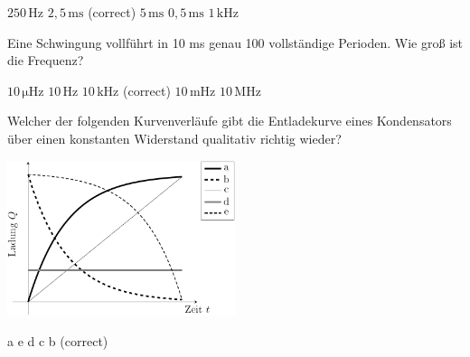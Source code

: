 \documentclass[11pt]{exam}
\begin{document}
\begin{questions}
\begin{choices}
	\choice \(\mathrm{250\,Hz}\)
	\choice \(\mathrm{2,5\,ms}\) (correct)
	\choice \(\mathrm{5\,ms}\)
	\choice \(\mathrm{0,5\,ms}\)
	\choice \(\mathrm{1\,kHz}\)
\end{choices}

\vspace{3mm}\question Eine Schwingung vollführt in 10 ms genau 100 vollständige Perioden. Wie groß ist die Frequenz?

\begin{choices}
	\choice \(\mathrm{10\,\mu Hz}\)
	\choice \(\mathrm{10\,Hz}\)
	\choice \(\mathrm{10\,kHz}\) (correct)
	\choice \(\mathrm{10\,mHz}\)
	\choice \(\mathrm{10\,MHz}\)
\end{choices}

\vspace{3mm}\question Welcher der folgenden Kurvenverläufe gibt die Entladekurve eines Kondensators über einen konstanten Widerstand qualitativ richtig wieder? 

\includegraphics[width=0.5\textwidth]{../../../questions/D/images/Kondensator-Q-t.png}

\begin{choices}
	\choice a
	\choice e
	\choice d
	\choice c
	\choice b (correct)
\end{choices}

\vspace{3mm}\end{questions}
\end{document}
